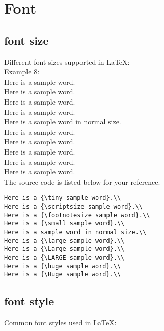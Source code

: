 \documentclass[12pt,a4paper]{article} %
\begin{document}
\section{Font}

\subsection{font size}
Different font sizes supported in \LaTeX:\\

\noindent Example 8:\\
Here is a {\tiny sample word}.\\
Here is a {\scriptsize sample word}.\\
Here is a {\footnotesize sample word}.\\
Here is a {\small sample word}.\\
Here is a sample word in normal size.\\
Here is a {\large sample word}.\\
Here is a {\Large sample word}.\\
Here is a {\LARGE sample word}.\\
Here is a {\huge sample word}.\\
Here is a {\Huge sample word}.\\

\noindent The source code is listed below for your reference.
\begin{verbatim}
Here is a {\tiny sample word}.\\
Here is a {\scriptsize sample word}.\\
Here is a {\footnotesize sample word}.\\
Here is a {\small sample word}.\\
Here is a sample word in normal size.\\
Here is a {\large sample word}.\\
Here is a {\Large sample word}.\\
Here is a {\LARGE sample word}.\\
Here is a {\huge sample word}.\\
Here is a {\Huge sample word}.\\
\end{verbatim}

\subsection{font style}
Common font styles used in \LaTeX:\\
\end{document}
